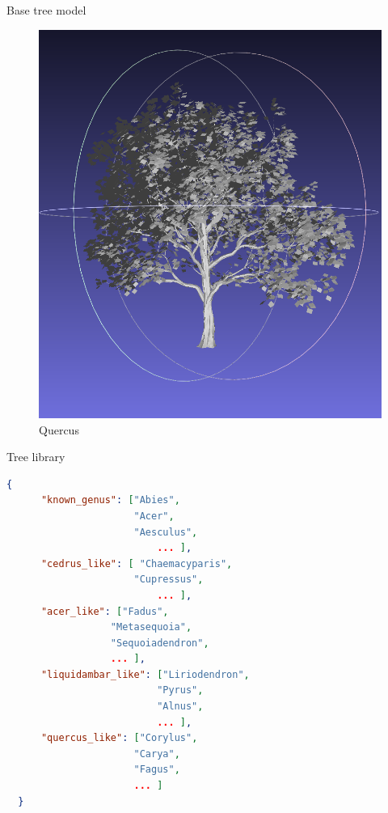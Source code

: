 \documentclass[10pt]{beamer}
\begin{document}
\begin{frame}{Base tree model}
\begin{figure}[H]
\begin{minipage}{0.24\textwidth}
        \includegraphics[width=\textwidth]{images/quercus.png}
        \caption{Quercus}
    \end{minipage}
\end{figure}
\end{frame}

\begin{frame}[fragile]{Tree library}
  \begin{lstlisting}[language=json]
  {
      "known_genus": ["Abies",
                      "Acer",
                      "Aesculus",
                          ... ],
      "cedrus_like": [ "Chaemacyparis",
                      "Cupressus",
                          ... ],
      "acer_like": ["Fadus",
                  "Metasequoia",
                  "Sequoiadendron",
                  ... ],
      "liquidambar_like": ["Liriodendron",
                          "Pyrus",
                          "Alnus",
                          ... ],
      "quercus_like": ["Corylus",
                      "Carya",
                      "Fagus",
                      ... ]
  }
  \end{lstlisting}
\end{frame}
\end{document}

